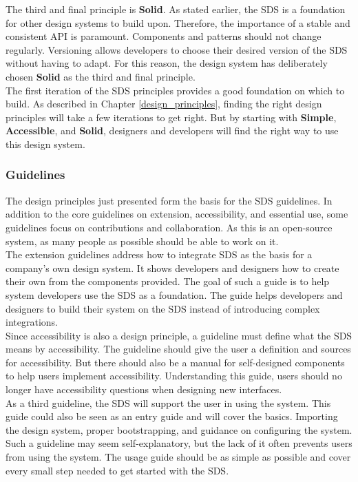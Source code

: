The third and final principle is \textbf{Solid}. As stated earlier, the \ac{SDS} is a foundation for other design systems to build upon. Therefore, the importance of a stable and consistent API is paramount. Components and patterns should not change regularly. Versioning allows developers to choose their desired version of the \ac{SDS} without having to adapt. For this reason, the design system has deliberately chosen \textbf{Solid} as the third and final principle. \\

The first iteration of the \acl{SDS} principles provides a good foundation on which to build. As described in Chapter \ref{design_principles}, finding the right design principles will take a few iterations to get right. But by starting with \textbf{Simple}, \textbf{Accessible}, and \textbf{Solid}, designers and developers will find the right way to use this design system.
\subsubsection{Guidelines}
The design principles just presented form the basis for the \ac{SDS} guidelines. In addition to the core guidelines on extension, accessibility, and essential use, some guidelines focus on contributions and collaboration. As this is an open-source system, as many people as possible should be able to work on it. \\

The extension guidelines address how to integrate \ac{SDS} as the basis for a company's own design system. It shows developers and designers how to create their own from the components provided. The goal of such a guide is to help system developers use the SDS as a foundation. The guide helps developers and designers to build their system on the SDS instead of introducing complex integrations. \\

Since accessibility is also a design principle, a guideline must define what the \ac{SDS} means by accessibility. The guideline should give the user a definition and sources for accessibility. But there should also be a manual for self-designed components to help users implement accessibility. Understanding this guide, users should no longer have accessibility questions when designing new interfaces. \\

As a third guideline, the \ac{SDS} will support the user in using the system. This guide could also be seen as an entry guide and will cover the basics. Importing the design system, proper bootstrapping, and guidance on configuring the system. Such a guideline may seem self-explanatory, but the lack of it often prevents users from using the system. The usage guide should be as simple as possible and cover every small step needed to get started with the \ac{SDS}. \\

